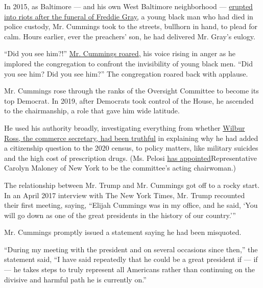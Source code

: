 In 2015, as Baltimore --- and his own West Baltimore neighborhood ---
\href{https://www.nytimes3xbfgragh.onion/2015/04/28/us/baltimore-freddie-gray.html?rref=collection\%2Fbyline\%2Fsheryl-gay-stolberg\&action=click\&contentCollection=undefined\&region=stream\&module=stream_unit\&version=search\&contentPlacement=7\&pgtype=collection}{erupted
into riots after the funeral of Freddie Gray,} a young black man who had
died in police custody, Mr. Cummings took to the streets, bullhorn in
hand, to plead for calm. Hours earlier, ever the preachers' son, he had
delivered Mr. Gray's eulogy.

``Did you see him?!''
\href{https://www.baltimoresun.com/82dc6d8d-529f-43e3-84c9-c28ed335a89e-132.html}{Mr.
Cummings roared,} his voice rising in anger as he implored the
congregation to confront the invisibility of young black men. ``Did you
see him? Did you see him?'' The congregation roared back with applause.

Mr. Cummings rose through the ranks of the Oversight Committee to become
its top Democrat. In 2019, after Democrats took control of the House, he
ascended to the chairmanship, a role that gave him wide latitude.

He used his authority broadly, investigating everything from whether
\href{https://www.baltimoresun.com/news/maryland/politics/bs-md-census-cummings-citizenship-question-20190314-story.html}{Wilbur
Ross, the commerce secretary, had been truthful} in explaining why he
had added a citizenship question to the 2020 census, to policy matters,
like military suicides and the high cost of prescription drugs. (Ms.
Pelosi
\href{https://www.nytimes3xbfgragh.onion/2019/10/17/us/politics/donald-trump-impeachment-news.html}{has
appointed}Representative Carolyn Maloney of New York to be the
committee's acting chairwoman.)

The relationship between Mr. Trump and Mr. Cummings got off to a rocky
start. In an April 2017 interview with The New York Times, Mr. Trump
recounted their first meeting, saying, ``Elijah Cummings was in my
office, and he said, `You will go down as one of the great presidents in
the history of our country.'''

Mr. Cummings promptly issued a statement saying he had been misquoted.

``During my meeting with the president and on several occasions since
then,'' the statement said, ``I have said repeatedly that he could be a
great president if --- if --- he takes steps to truly represent all
Americans rather than continuing on the divisive and harmful path he is
currently on.''


